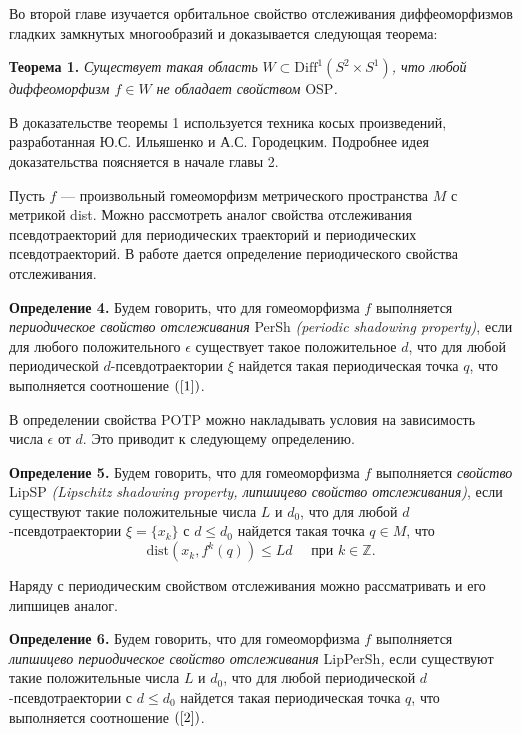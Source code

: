 \documentclass[12pt]{article}
\begin{document}
Во второй главе изучается орбитальное свойство отслеживания диффеоморфизмов гладких замкнутых многообразий и доказывается следующая теорема:
 
\textbf{Теорема 1.} \textit{Существует такая область} $W\subset\mbox{Diff}^1(S^2\times S^1)$\textit{, что любой диффеоморфизм $f\in W$ не обладает свойством} OSP\textit{.}  

В доказательстве теоремы 1 используется техника косых произведений, разработанная Ю.С. Ильяшенко и А.С. Городецким. Подробнее идея доказательства поясняется в начале главы 2.

Пусть $f$ --- произвольный  гомеоморфизм метрического пространства $M$ с метрикой dist.  
Можно рассмотреть аналог свойства отслеживания псевдотраекторий для периодических траекторий и периодических псевдотраекторий. В работе \cite{K} дается определение периодического свойства отслеживания.

\textbf{Определение 4.} Будем говорить, что для гомеоморфизма $f$ выполняется \textit{периодическое свойство отслеживания} PerSh \textit{(periodic shadowing property)}, если для любого положительного $\epsilon$ существует такое положительное $d$, что для любой периодической $d$-псевдотраектории $\xi$ найдется такая периодическая точка $q$, что выполняется соотношение $(\ref{1})$.

В определении свойства POTP можно накладывать условия на зависимость числа $\epsilon$ от $d$. Это приводит к следующему определению. 

\textbf{Определение 5.} Будем говорить, что для гомеоморфизма $f$ выполняется \textit{свойство} LipSP \textit{(Lipschitz shadowing property, липшицево свойство отслеживания)}, если существуют такие положительные числа $L$ и $d_0$, что для любой $d$-псевдотраектории $\xi=\{x_k\}$ с $d\leq d_0$ найдется такая точка $q\in M$, что
\begin{equation}
\label{2}
\mbox{dist}(x_k,f^k(q))\leq Ld\quad\mbox{ при }k\in\mathbb{Z}.
\end{equation}

Наряду с периодическим свойством отслеживания можно рассматривать и его липшицев аналог.

\textbf{Определение 6.} Будем говорить, что для гомеоморфизма $f$ выполняется \textit{липшицево периодическое свойство отслеживания} LipPerSh\textit{,} если существуют такие положительные числа $L$ и $d_0$, что для любой периодической $d$-псевдотраектории с $d\leq d_0$ найдется такая периодическая точка $q$, что выполняется соотношение $(\ref{2})$.
 
\end{document}

